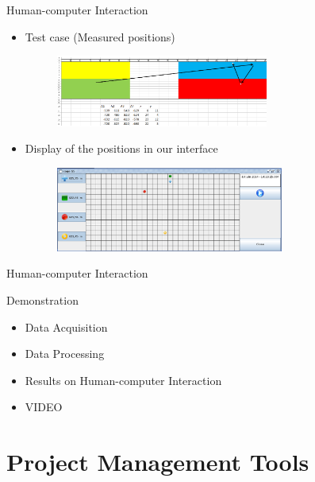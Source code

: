 \documentclass[utf8,compress]{beamer}
\begin{document}
\begin{frame}[containsverbatim]{Human-computer Interaction}
\begin{itemize}
    \item Test case (Measured positions)
 \begin{figure}[h]
        \includegraphics[width=7cm]{theo.png}
    \end{figure}
    \item Display of the positions in our interface
 \begin{figure}[h]
        \includegraphics[width=7.5cm]{interf.png}
    \end{figure}
\end{itemize}
 \end{frame}

\begin{frame}[containsverbatim]{Human-computer Interaction}

\begin{block}{Demonstration}
\vspace{0.8em} 
\begin{itemize}
    \item Data Acquisition
\vspace{0.8em} 
    \item Data Processing 
\vspace{0.8em} 
    \item Results on Human-computer Interaction
\vspace{0.8em} 
 \item  VIDEO
\vspace{0.8em} 
\end{itemize}
\end{block}
 \end{frame}



\section{Project Management Tools }
\end{document}

